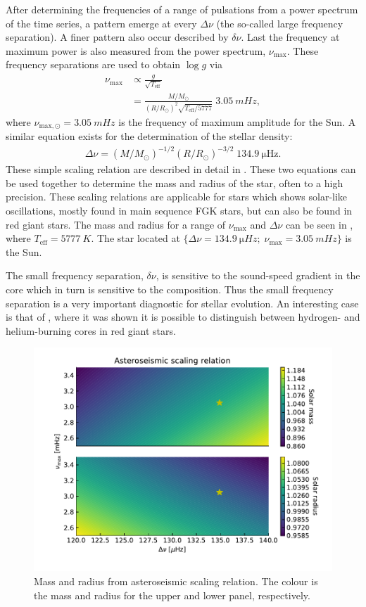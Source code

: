 After determining the frequencies of a range of pulsations from a power spectrum
of the time series, a pattern emerge at every $\Delta\nu$ (the so-called large
frequency separation). A finer pattern also occur described by $\delta\nu$. Last
the frequency at maximum power is also measured from the power spectrum,
$\nu_\mathrm{max}$. These frequency separations are used to obtain $\log g$ via
\begin{align}
  \nu_\mathrm{max} &\propto \frac{g}{\sqrt{T_\mathrm{eff}}} \\
                   &= \frac{M/M_\odot}{(R/R_\odot)^2 \sqrt{T_\mathrm{eff}/5777}}\; \SI{3.05}{mHz},\label{eq:scaling1}
\end{align}
where $\nu_{\mathrm{max},\odot}=\SI{3.05}{mHz}$ is the frequency of maximum
amplitude for the Sun. A similar equation exists for the determination of the
stellar density:
\begin{align}
  \Delta\nu = (M/M_\odot)^{-1/2} (R/R_\odot)^{-3/2}\; \SI{134.9}{\micro\hertz}.
\end{align}
These simple scaling relation are described in detail in \citet{Kjeldsen1995}.
These two equations can be used together to determine the mass and radius of the
star, often to a high precision. These scaling relations are applicable for
stars which shows solar-like oscillations, mostly found in main sequence FGK
stars, but can also be found in red giant stars. The mass and radius for a range
of $\nu_\mathrm{max}$ and $\Delta\nu$ can be seen in , where
$T_\mathrm{eff}=\SI{5777}{K}$. The star located at
$\{\Delta\nu=\SI{134.9}{\micro Hz};\;\nu_\mathrm{max}=\SI{3.05}{mHz}\}$ is the
Sun.

The small frequency separation, $\delta\nu$, is sensitive to the sound-speed
gradient in the core which in turn is sensitive to the composition. Thus the
small frequency separation is a very important diagnostic for stellar evolution.
An interesting case is that of \citet{Bedding2011}, where it was shown it is
possible to distinguish between hydrogen- and helium-burning cores in red giant
stars.

\begin{figure}[htpb!]
    \centering
    \includegraphics[width=0.85\linewidth]{figures/scaling_relation.pdf}
    \caption{Mass and radius from asteroseismic scaling relation. The colour
             is the mass and radius for the upper and lower panel, respectively.}
    \label{fig:scaling}
\end{figure}

